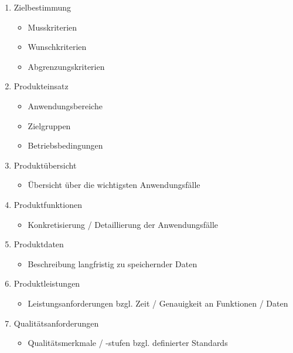 \documentclass{bschlangaul-theorie}
\begin{document}
\begin{enumerate}
\item Zielbestimmung

\begin{itemize}
\item Musskriterien
\item Wunschkriterien
\item Abgrenzungskriterien
\end{itemize}

\item Produkteinsatz

\begin{itemize}
\item Anwendungsbereiche
\item Zielgruppen
\item Betriebsbedingungen
\end{itemize}

\item Produktübersicht

\begin{itemize}
\item Übersicht über die wichtigsten Anwendungsfälle
\end{itemize}

\item Produktfunktionen

\begin{itemize}
\item Konkretisierung / Detaillierung der Anwendungsfälle
\end{itemize}

\item Produktdaten

\begin{itemize}
\item Beschreibung langfristig zu speichernder Daten
\end{itemize}

\item Produktleistungen

\begin{itemize}
\item Leistungsanforderungen bzgl. Zeit / Genauigkeit an Funktionen / Daten
\end{itemize}

\item Qualitätsanforderungen

\begin{itemize}
\item Qualitätsmerkmale / -stufen \zB bzgl. definierter Standards
\end{itemize}


\end{enumerate}
\end{document}
